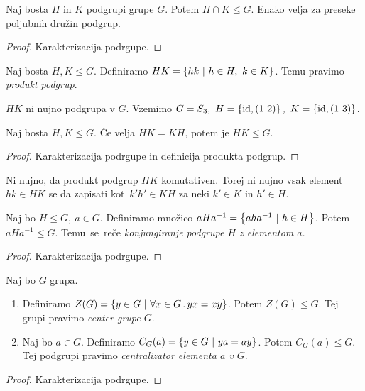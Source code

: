 \newpage
\begin{trditev}
    Naj bosta $H$ in $K$ podgrupi grupe $G$. Potem $H \cap K \leq G$. Enako velja za preseke poljubnih družin podgrup.
\end{trditev}

\begin{proof}
    Karakterizacija podrgupe.
\end{proof}

\begin{definicija}
    Naj bosta $H, K \leq G$. Definiramo $HK = \left\{hk \ | \ h \in H, \ k \in K\right\}$. Temu pravimo \emph{produkt podgrup}.
\end{definicija}

\begin{zgled}
    $H K$ ni nujno podgrupa v $G$. Vzemimo $G = S_3, \ H =\left\{\operatorname{id}, (1\ 2)\right\}, \ K = \left\{\operatorname{id}, (1\ 3)\right\}$.
\end{zgled}

\begin{trditev}
    Naj bosta $H, K \leq G$. Če velja $HK = KH$, potem je $HK \leq G$.
\end{trditev}

\begin{proof}
    Karakterizacija podrgupe in definicija produkta podgrup.
\end{proof}

\begin{opomba}
    Ni nujno, da produkt podgrup $HK$ komutativen. Torej ni nujno vsak element $hk \in HK$ se da zapisati kot~$k'h' \in KH$ za neki $k' \in K$ in $h' \in H$.
\end{opomba}

\begin{definicija}
    Naj bo $H \leq G, \ a \in G$. Definiramo množico $aHa^{-1} = \left\{aha^{-1} \ | \ h \in H\right\}$. Potem $aHa^{-1} \leq G$. Temu~se~reče \emph{konjungiranje podgrupe $H$ z elementom $a$}.
\end{definicija}

\begin{proof}
    Karakterizacija podrgupe.
\end{proof}

\begin{trditev}
    Naj bo $G$ grupa.
    \begin{enumerate}
        \item Definiramo $Z(G) = \left\{y \in G \ | \ \forall x \in G \,.\, yx=xy\right\}$. Potem $Z(G) \leq G$. Tej grupi pravimo \emph{center grupe $G$}.
        \item Naj bo $a \in G$. Definiramo $C_G(a) = \left\{y \in G \ | \ ya = ay\right\}$. Potem $C_G(a) \leq G$. Tej podgrupi pravimo \emph{centralizator elementa $a$ v $G$}.
    \end{enumerate}
\end{trditev}

\begin{proof}
    Karakterizacija podrgupe.
\end{proof}